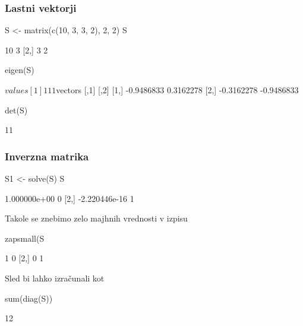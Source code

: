 \begin{frame}[fragile]
\frametitle{Lastni vektorji}
\begin{Schunk}
\begin{Sinput}
 S <- matrix(c(10, 3, 3, 2), 2, 2)
 S
\end{Sinput}
\begin{Soutput}
     [,1] [,2]
[1,]   10    3
[2,]    3    2
\end{Soutput}
\begin{Sinput}
 eigen(S)
\end{Sinput}
\begin{Soutput}
$values
[1] 11  1

$vectors
           [,1]       [,2]
[1,] -0.9486833  0.3162278
[2,] -0.3162278 -0.9486833
\end{Soutput}
\begin{Sinput}
 det(S)
\end{Sinput}
\begin{Soutput}
[1] 11
\end{Soutput}
\end{Schunk}
\end{frame}


\begin{frame}[fragile]
\frametitle{Inverzna matrika}
\begin{Schunk}
\begin{Sinput}
 S1 <- solve(S)
 S %*% S1
\end{Sinput}
\begin{Soutput}
              [,1] [,2]
[1,]  1.000000e+00    0
[2,] -2.220446e-16    1
\end{Soutput}
\end{Schunk}
Takole se znebimo zelo majhnih vrednosti v izpisu

\begin{Schunk}
\begin{Sinput}
 zapsmall(S %*% S1)
\end{Sinput}
\begin{Soutput}
     [,1] [,2]
[1,]    1    0
[2,]    0    1
\end{Soutput}
\end{Schunk}

Sled bi lahko izračunali kot

\begin{Schunk}
\begin{Sinput}
 sum(diag(S))
\end{Sinput}
\begin{Soutput}
[1] 12
\end{Soutput}
\end{Schunk}

\end{frame}


